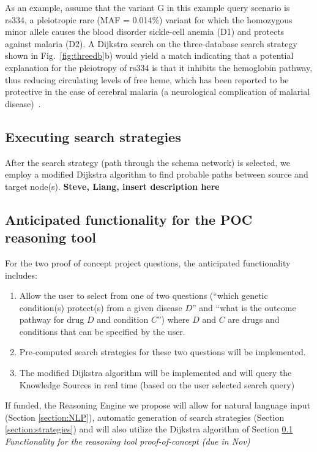 \documentclass[11pt,notitlepage]{article}
\begin{document}
As an example, assume that the variant G in this example query scenario is rs334, a pleiotropic rare (MAF = 0.014\%) variant for which the homozygous minor allele causes the blood disorder sickle-cell anemia (D1) and protects against malaria (D2). A Dijkstra search on the three-database search strategy shown in Fig.~\ref{fig:threedb}b) would yield a match indicating that a potential explanation for the pleiotropy of rs334 is that it inhibits the hemoglobin pathway, thus reducing circulating levels of free heme, which has been reported to be protective in the case of cerebral malaria (a neurological complication of malarial disease)~\cite{Ferreira:2011ff}.

\subsection{Executing search strategies}
\label{section:Dijkstra}
After the search strategy (path through the schema network) is selected, we employ a modified Dijkstra algorithm to find probable paths between source and target node(s).
\textbf{Steve, Liang, insert description here}



\subsection{Anticipated functionality for the POC reasoning tool}
For the two proof of concept project questions, the anticipated functionality includes:
\begin{enumerate}
\item Allow the user to select from one of two questions (``which genetic condition(s) protect(s) from a given disease $D$'' and ``what is the outcome pathway for drug $D$ and condition $C$'') where $D$ and $C$ are drugs and conditions that can be specified by the user.
\item Pre-computed search strategies for these two questions will be implemented.
\item The modified Dijkstra algorithm will be implemented and will query the Knowledge Sources in real time (based on the user selected search query)
\end{enumerate}
If funded, the Reasoning Engine we propose will allow for natural language input (Section \ref{section:NLP}), automatic generation of search strategies (Section \ref{section:strategies}) and will also utilize the Dijkstra algorithm of Section \ref{section:Dijkstra}
\textit{Functionality for the reasoning tool proof-of-concept (due in Nov)}
\end{document}
